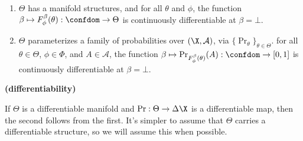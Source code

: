 \begin{CFaxioms}
	\item \label{ax:diffble}
	\begin{enumerate}
	\item $\Theta$ has a manifold structures, and
		for all $\theta$ and $\phi$, the function $\beta \mapsto F^{\beta}_\phi(\theta) : \confdom \to \Theta$
		is continuously differentiable at $\beta = \bot$. %
	\item 
		$\Theta$ parameterizes a family of probabilities over $(\X, \mathcal A)$,
		via $\{ \Pr_\theta \}_{\theta \in \Theta}$.
		for all $\theta \in \Theta$, $\phi \in \Phi$, and  $A \in \mathcal A$,
		the function $\beta \mapsto \Pr_{F^{\beta}_\phi(\theta)}(A)
		: \confdom \to \mathbb [0,1]$ is
		continuously differentiable at $\beta=\bot$. 
			\label{ax:diffble2}
	\end{enumerate}
	\hfill \textbf{(differentiability)}
\end{CFaxioms}

If $\Theta$ is a differentiable manifold and $\Pr: \Theta \to \Delta\X$ is a differentiable map, then the second follows from the first. 
It's simpler to assume that $\Theta$ carries a differentiable structure, so we will assume this when possible.
